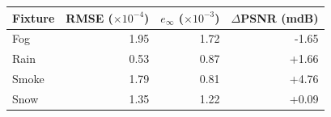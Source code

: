 \noindent\begin{minipage}{\linewidth}
\centering\footnotesize\renewcommand{\arraystretch}{1.12}\setlength{\tabcolsep}{3pt}
\label{tab:nano-agreement}
\begin{tabular}{@{}lrrr@{}}\toprule
Fixture & \shortstack{RMSE\\($\times10^{-4}$)} & \shortstack{$e_\infty$\\($\times10^{-3}$)} & \shortstack{$\Delta$PSNR\\(mdB)}\\\midrule
Fog & 1.95 & 1.72 & -1.65\\
Rain & 0.53 & 0.87 & +1.66\\
Smoke & 1.79 & 0.81 & +4.76\\
Snow & 1.35 & 1.22 & +0.09\\
\bottomrule\end{tabular}
\end{minipage}\par
